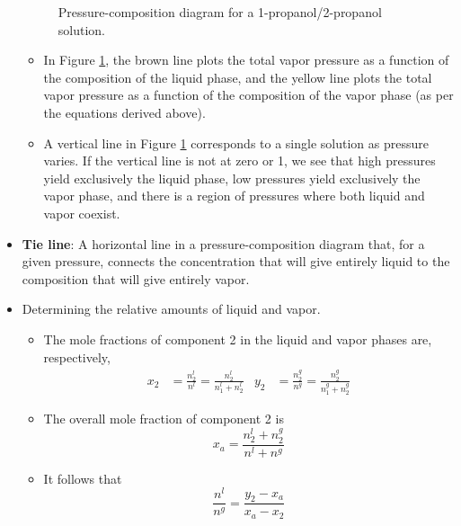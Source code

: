 \documentclass[../notes.tex]{subfiles}
\begin{document}
\begin{itemize}
\begin{figure}[H]
        \caption{Pressure-composition diagram for a 1-propanol/2-propanol solution.}
        \label{fig:PCdiagram}
    \end{figure}
    \begin{itemize}
        \item In Figure \ref{fig:PCdiagram}, the brown line plots the total vapor pressure as a function of the composition of the liquid phase, and the yellow line plots the total vapor pressure as a function of the composition of the vapor phase (as per the equations derived above).
        \item A vertical line in Figure \ref{fig:PCdiagram} corresponds to a single solution as pressure varies. If the vertical line is not at zero or 1, we see that high pressures yield exclusively the liquid phase, low pressures yield exclusively the vapor phase, and there is a region of pressures where both liquid and vapor coexist.
    \end{itemize}
    \item \textbf{Tie line}: A horizontal line in a pressure-composition diagram that, for a given pressure, connects the concentration that will give entirely liquid to the composition that will give entirely vapor.
    \item Determining the relative amounts of liquid and vapor.
    \begin{itemize}
        \item The mole fractions of component 2 in the liquid and vapor phases are, respectively,
        \begin{align*}
            x_2 &= \frac{n_2^l}{n^l} = \frac{n_2^l}{n_1^l+n_2^l}&
            y_2 &= \frac{n_2^g}{n^g} = \frac{n_2^g}{n_1^g+n_2^g}
        \end{align*}
        \item The overall mole fraction of component 2 is
        \begin{equation*}
            x_a = \frac{n_2^l+n_2^g}{n^l+n^g}
        \end{equation*}
        \item It follows that
        \begin{equation*}
            \frac{n^l}{n^g} = \frac{y_2-x_a}{x_a-x_2}
        \end{equation*}
    \end{itemize}

\end{itemize}
\end{document}
